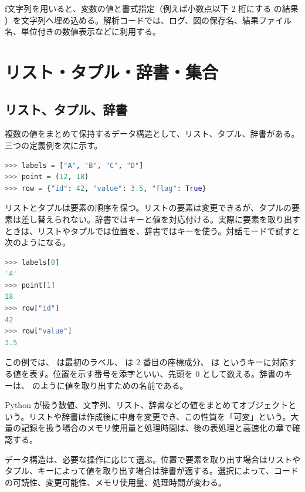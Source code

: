 f文字列を用いると、変数の値と書式指定（例えば小数点以下 2 桁にする  の結果 ）を文字列へ埋め込める。解析コードでは、ログ、図の保存名、結果ファイル名、単位付きの数値表示などに利用する。

\section{リスト・タプル・辞書・集合}

\subsection{リスト、タプル、辞書}

複数の値をまとめて保持するデータ構造として、リスト、タプル、辞書がある。三つの定義例を次に示す。

\begin{lstlisting}[language=Python, numbers=none, xleftmargin=2\zw]
>>> labels = ["A", "B", "C", "D"]
>>> point = (12, 18)
>>> row = {"id": 42, "value": 3.5, "flag": True}
\end{lstlisting}

リストとタプルは要素の順序を保つ。リストの要素は変更できるが、タプルの要素は差し替えられない。辞書ではキーと値を対応付ける。実際に要素を取り出すときは、リストやタプルでは位置を、辞書ではキーを使う。対話モードで試すと次のようになる。

\begin{lstlisting}[language=Python, numbers=none, xleftmargin=2\zw]
>>> labels[0]
'A'
>>> point[1]
18
>>> row["id"]
42
>>> row["value"]
3.5
\end{lstlisting}

この例では、 は最初のラベル、 は 2 番目の座標成分、 は  というキーに対応する値を表す。位置を示す番号を添字といい、先頭を 0 として数える。辞書のキーは、 のように値を取り出すための名前である。

Python が扱う数値、文字列、リスト、辞書などの値をまとめてオブジェクトという。リストや辞書は作成後に中身を変更でき、この性質を「可変」という。大量の記録を扱う場合のメモリ使用量と処理時間は、後の表処理と高速化の章で確認する。

データ構造は、必要な操作に応じて選ぶ。位置で要素を取り出す場合はリストやタプル、キーによって値を取り出す場合は辞書が適する。選択によって、コードの可読性、変更可能性、メモリ使用量、処理時間が変わる。

